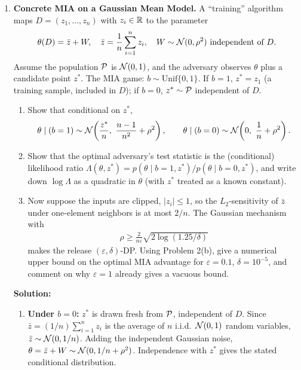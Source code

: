 \documentclass[12pt]{article}
\begin{document}
\begin{enumerate}
\item \textbf{Concrete MIA on a Gaussian Mean Model.}
A ``training'' algorithm maps $D = (z_1, \ldots, z_n)$ with $z_i \in {\mathbb{R}}$ to the parameter
\begin{align*}
    \theta(D) = \bar z + W, \quad \bar z = \frac{1}{n}\sum_{i=1}^n z_i, \quad W \sim {\mathcal{N}}(0, \rho^2) \text{ independent of } D.
\end{align*}
Assume the population ${\mathcal{P}}$ is ${\mathcal{N}}(0, 1)$, and the adversary observes $\theta$ plus a candidate point $z^*$. The MIA game: $b \sim \mathrm{Unif}\{0,1\}$. If $b=1$, $z^* = z_1$ (a training sample, included in $D$); if $b=0$, $z^* \sim {\mathcal{P}}$ independent of $D$.
\begin{enumerate}
    \item Show that conditional on $z^*$,
    \begin{align*}
        \theta \mid (b=1) \sim \cN\!\left(\frac{z^*}{n},\ \frac{n-1}{n^2} + \rho^2\right), \qquad \theta \mid (b=0) \sim \cN\!\left(0,\ \frac{1}{n} + \rho^2\right).
    \end{align*}

    \item Show that the optimal adversary's test statistic is the (conditional) likelihood ratio $\Lambda(\theta, z^*) = p(\theta \mid b=1, z^*)/p(\theta \mid b=0, z^*)$, and write down $\log \Lambda$ as a quadratic in $\theta$ (with $z^*$ treated as a known constant).

    \item Now suppose the inputs are clipped, $|z_i| \le 1$, so the $L_2$-sensitivity of $\bar z$ under one-element neighbors is at most $2/n$. The Gaussian mechanism with
    \begin{align*}
        \rho \ge \frac{2}{n\varepsilon}\sqrt{2\log(1.25/\delta)}
    \end{align*}
    makes the release $(\varepsilon, \delta)$-DP. Using Problem 2(b), give a numerical upper bound on the optimal MIA advantage for $\varepsilon = 0.1$, $\delta = 10^{-5}$, and comment on why $\varepsilon = 1$ already gives a vacuous bound.
\end{enumerate}

\begin{solution}
{\bf Solution:}\\
\begin{enumerate}
    \item \textbf{Under $b=0$:} $z^*$ is drawn fresh from ${\mathcal{P}}$, independent of $D$. Since $\bar z = (1/n)\sum_{i=1}^n z_i$ is the average of $n$ i.i.d.\ ${\mathcal{N}}(0,1)$ random variables, $\bar z \sim {\mathcal{N}}(0, 1/n)$. Adding the independent Gaussian noise, $\theta = \bar z + W \sim {\mathcal{N}}(0, 1/n + \rho^2)$. Independence with $z^*$ gives the stated conditional distribution.


\end{enumerate}
\end{solution}
\end{enumerate}
\end{document}
